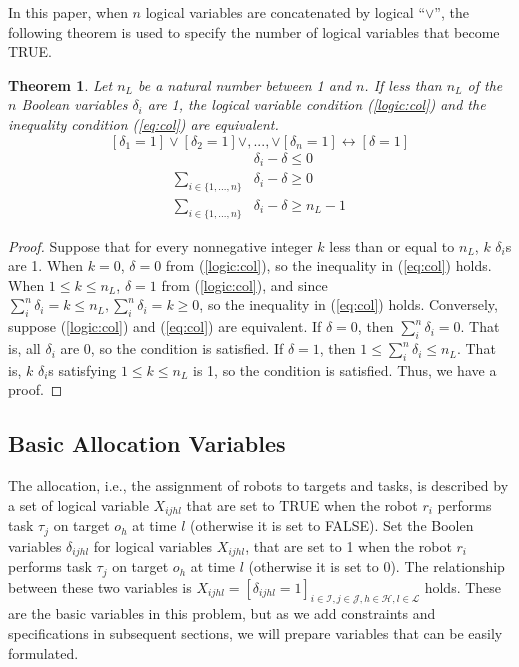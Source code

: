 \documentclass[]{interact}
\theoremstyle{plain}%
\newtheorem{theorem}{Theorem}[section]
\theoremstyle{definition}
\theoremstyle{remark}
\begin{document}
In this paper, when $n$ logical variables are concatenated by logical ``$\vee$'', the following theorem is used to specify the number of logical variables that become TRUE.
\begin{theorem}\label{theorem:Const}
    Let $n_L$ be a natural number between 1 and $n$.
    If less than $n_L$ of the $n$ Boolean variables $\delta_{i}$ are 1, the logical variable condition (\ref{logic:col}) and the inequality condition (\ref{eq:col}) are equivalent.
    \begin{equation}\label{logic:col}
        [\delta_1 = 1]\vee [\delta_2 = 1]\vee,...,\vee [\delta_n = 1] \leftrightarrow [\delta = 1]
    \end{equation}
    \begin{align}
        &\delta_i - \delta \le 0\nonumber\\
        \sum_{i\in\{1,...,n\}}&\delta_i - \delta \ge 0\label{eq:col}\\
        \sum_{i\in\{1,...,n\}}&\delta_i - \delta \ge n_L-1\nonumber
    \end{align}
\end{theorem}
\begin{proof}
    Suppose that for every nonnegative integer $k$ less than or equal to $n_L$, $k$ $\delta_i$s are 1.
    When $k=0$, $\delta=0$ from (\ref{logic:col}), so the inequality in (\ref{eq:col}) holds.
    When $1\le k\le n_L$, $\delta=1$ from (\ref{logic:col}), and since $\sum_{i}^n\delta_i=k\le n_L,\sum_{i}^n\delta_i=k\ge 0$, so the inequality in (\ref{eq:col}) holds.
    Conversely, suppose (\ref{logic:col}) and (\ref{eq:col}) are equivalent.
    If $\delta = 0$, then $\sum_{i}^n\delta_i=0$. That is, all $\delta_i$ are 0, so the condition is satisfied.
    If $\delta = 1$, then $1\le \sum_{i}^n\delta_i \le n_L$.
    That is, $k$ $\delta_i$s satisfying $1\le k \le n_L$ is 1, so the condition is satisfied.
    Thus, we have a proof.
\end{proof}

    
\subsection{Basic Allocation Variables}
The allocation, i.e., the assignment of robots to targets and tasks, is described by a set of logical variable $X_{ijhl}$ that are set to TRUE when the robot $r_i$ performs task $\tau_j$ on target $o_h$ at time $l$ (otherwise it is set to FALSE).
Set the Boolen variables $\delta_{ijhl}$ for logical variables $X_{ijhl}$, that are set to 1 when the robot $r_i$ performs task $\tau_j$ on target $o_h$ at time $l$ (otherwise it is set to 0).
The relationship between these two variables is $X_{ijhl}=[\delta_{ijhl}=1]_{i\in\mathcal{I},j\in\mathcal{J},h\in\mathcal{H},l\in\mathcal{L}}$ holds.
These are the basic variables in this problem, but as we add constraints and specifications in subsequent sections, we will prepare variables that can be easily formulated.
\end{document}
